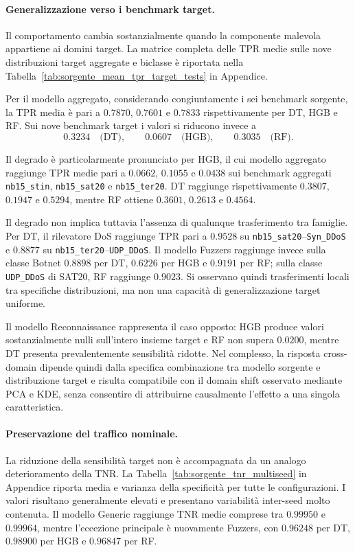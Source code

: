 \paragraph{Generalizzazione verso i benchmark target.}
Il comportamento cambia sostanzialmente quando la componente malevola appartiene ai domini target. 
La matrice completa delle TPR medie sulle nove distribuzioni target aggregate e biclasse è riportata nella Tabella~\ref{tab:sorgente_mean_tpr_target_tests} in Appendice.

Per il modello aggregato, considerando congiuntamente i sei benchmark sorgente, la TPR media è pari a $0.7870$, $0.7601$ e $0.7833$ rispettivamente per DT, HGB e RF. 
Sui nove benchmark target i valori si riducono invece a
\[
    0.3234 \quad \text{(DT)}, \qquad
    0.0607 \quad \text{(HGB)}, \qquad
    0.3035 \quad \text{(RF)}.
\]

Il degrado è particolarmente pronunciato per HGB, il cui modello aggregato raggiunge TPR medie pari a $0.0662$, $0.1055$ e $0.0438$ sui benchmark aggregati \texttt{nb15\_stin}, \texttt{nb15\_sat20} e \texttt{nb15\_ter20}. 
DT raggiunge rispettivamente $0.3807$, $0.1947$ e $0.5294$, mentre RF ottiene $0.3601$, $0.2613$ e $0.4564$.

Il degrado non implica tuttavia l'assenza di qualunque trasferimento tra famiglie. 
Per DT, il rilevatore DoS raggiunge TPR pari a $0.9528$ su \texttt{nb15\_sat20}--\texttt{Syn\_DDoS} e $0.8877$ su \texttt{nb15\_ter20}--\texttt{UDP\_DDoS}. 
Il modello Fuzzers raggiunge invece sulla classe Botnet $0.8898$ per DT, $0.6226$ per HGB e $0.9191$ per RF; sulla classe \texttt{UDP\_DDoS} di SAT20, RF raggiunge $0.9023$.
Si osservano quindi trasferimenti locali tra specifiche distribuzioni, ma non una capacità di generalizzazione target uniforme.

Il modello Reconnaissance rappresenta il caso opposto: HGB produce valori sostanzialmente nulli sull'intero insieme target e RF non supera $0.0200$, mentre DT presenta prevalentemente sensibilità ridotte. 
Nel complesso, la risposta cross-domain dipende quindi dalla specifica combinazione tra modello sorgente e distribuzione target e risulta compatibile con il domain shift osservato mediante PCA e KDE, senza consentire di attribuirne causalmente l'effetto a una singola caratteristica.

\paragraph{Preservazione del traffico nominale.}
La riduzione della sensibilità target non è accompagnata da un analogo deterioramento della TNR. 
La Tabella~\ref{tab:sorgente_tnr_multiseed} in Appendice riporta media e varianza della specificità per tutte le configurazioni. 
I valori risultano generalmente elevati e presentano variabilità inter-seed molto contenuta. 
Il modello Generic raggiunge TNR medie comprese tra $0.99950$ e $0.99964$, mentre l'eccezione principale è nuovamente Fuzzers, con $0.96248$ per DT, $0.98900$ per HGB e $0.96847$ per RF.

